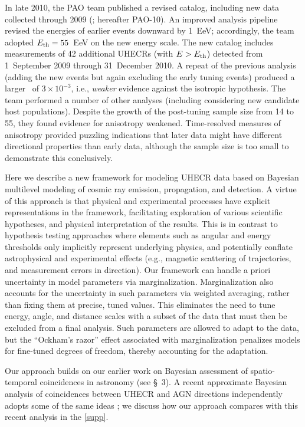 
In late 2010, the PAO team published a revised catalog, including new data
collected through 2009 (\cite{PAO10-AnisoUpdate}; hereafter PAO-10).  An
improved analysis pipeline revised the energies of earlier events downward
by 1~EeV; accordingly, the team adopted $E_{\rm th} = 55$~EeV on the new energy
scale.  The new catalog includes measurements of 42 additional UHECRs (with
$E>E_{\rm th}$) detected from 1~September 2009 through 31~December 2010.  A repeat
of the previous analysis (adding the new events but again excluding the
early tuning events) produced a larger \pval\ of $3\times 10^{-3}$, i.e.,
{\em weaker} evidence against the isotropic hypothesis.  The team performed
a number of other analyses (including considering new candidate host
populations).  Despite the growth of the post-tuning sample size from 14 to
55, they found evidence for anisotropy weakened.  Time-resolved measures of
anisotropy provided puzzling indications that later data might have
different directional properties than early data, although the sample size
is too small to demonstrate this conclusively.

Here we describe a new framework for modeling UHECR data based on Bayesian
multilevel modeling of cosmic ray emission, propagation, and detection.
A virtue of this approach is that physical and experimental
processes have explicit representations in the framework, facilitating
exploration of various scientific hypotheses, and physical interpretation of
the results.  This is in contrast to
hypothesis testing approaches where elements such as angular and energy
thresholds only implicitly represent underlying physics, and potentially
conflate astrophysical and experimental effects (e.g., magnetic scattering
of trajectories, and measurement errors in direction).
Our framework can
handle a priori uncertainty in model parameters via marginalization. 
Marginalization also accounts for the uncertainty in such parameters via
weighted averaging, rather than fixing them at precise, tuned values.  This
eliminates the need to tune energy, angle, and distance scales with a subset
of the data that must then be excluded from a final analysis.  Such parameters
are allowed to adapt to the data, but the ``Ockham's razor'' effect associated
with marginalization penalizes models for fine-tuned degrees of freedom,
thereby accounting for the adaptation.

Our approach builds on our earlier work on Bayesian assessment of
spatio-temporal coincidences in astronomy (see \S~3).  A recent
approximate Bayesian analysis of coincidences between UHECR and AGN
directions independently adopts some of the same ideas \citep{WMJ11-BayesUHECR};
we discuss how our approach compares with this recent analysis in
the \ref{supp}.

